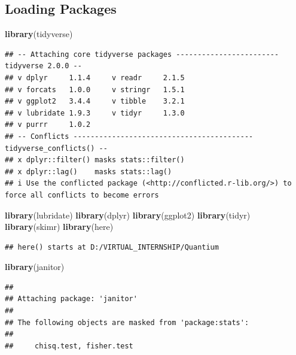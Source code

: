 \documentclass[
]{article}
\newenvironment{Shaded}{\begin{snugshade}}{\end{snugshade}}
\newcommand{\FunctionTok}[1]{\textcolor[rgb]{0.13,0.29,0.53}{\textbf{#1}}}
\newcommand{\NormalTok}[1]{#1}
\begin{document}
\hypertarget{loading-packages}{%
\subsection{Loading Packages}\label{loading-packages}}

\begin{Shaded}
\begin{Highlighting}[]
\FunctionTok{library}\NormalTok{(tidyverse)}
\end{Highlighting}
\end{Shaded}

\begin{verbatim}
## -- Attaching core tidyverse packages ------------------------ tidyverse 2.0.0 --
## v dplyr     1.1.4     v readr     2.1.5
## v forcats   1.0.0     v stringr   1.5.1
## v ggplot2   3.4.4     v tibble    3.2.1
## v lubridate 1.9.3     v tidyr     1.3.0
## v purrr     1.0.2     
## -- Conflicts ------------------------------------------ tidyverse_conflicts() --
## x dplyr::filter() masks stats::filter()
## x dplyr::lag()    masks stats::lag()
## i Use the conflicted package (<http://conflicted.r-lib.org/>) to force all conflicts to become errors
\end{verbatim}

\begin{Shaded}
\begin{Highlighting}[]
\FunctionTok{library}\NormalTok{(lubridate)}
\FunctionTok{library}\NormalTok{(dplyr)}
\FunctionTok{library}\NormalTok{(ggplot2)}
\FunctionTok{library}\NormalTok{(tidyr)}
\FunctionTok{library}\NormalTok{(skimr)}
\FunctionTok{library}\NormalTok{(here)}
\end{Highlighting}
\end{Shaded}

\begin{verbatim}
## here() starts at D:/VIRTUAL_INTERNSHIP/Quantium
\end{verbatim}

\begin{Shaded}
\begin{Highlighting}[]
\FunctionTok{library}\NormalTok{(janitor)}
\end{Highlighting}
\end{Shaded}

\begin{verbatim}
## 
## Attaching package: 'janitor'
## 
## The following objects are masked from 'package:stats':
## 
##     chisq.test, fisher.test
\end{verbatim}
\end{document}
